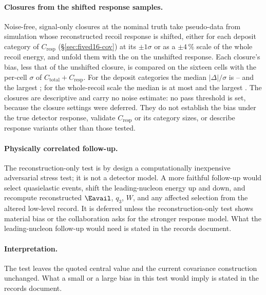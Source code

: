 \paragraph{Closures from the shifted response samples.} Noise-free, signal-only closures at the nominal truth take pseudo-data from simulation whose reconstructed recoil response is shifted, either for each deposit category of $C_{\mathrm{resp}}$ (\S\ref{sec:fived16-cov}) at its $\pm1\sigma$ or as a $\pm4\,\%$ scale of the whole recoil energy, and unfold them with the \estMultiD{} on the unshifted response. Each closure's bias, less that of the unshifted closure, is compared on the sixteen cells with the per-cell $\sigma$ of $C_{\mathrm{total}}+C_{\mathrm{resp}}$. For the deposit categories the median $|\Delta|/\sigma$ is -- and the largest ; for the whole-recoil scale the median is at most  and the largest . The closures are descriptive and carry no noise estimate: no pass threshold is set, because the closure settings were deferred. They do not establish the bias under the true detector response, validate $C_{\mathrm{resp}}$ or its category sizes, or describe response variants other than those tested.

\paragraph{Physically correlated follow-up.} The reconstruction-only test is by design a computationally inexpensive adversarial stress test; it is not a detector model. A more faithful follow-up would select quasielastic events, shift the leading-nucleon energy up and down, and recompute reconstructed $\Eavail$, $q_{3}$, $W$, and any affected selection from the altered low-level record. It is deferred unless the reconstruction-only test shows material bias or the collaboration asks for the stronger response model. What the leading-nucleon follow-up would need is stated in the records document.

\paragraph{Interpretation.} The test leaves the quoted central value and the current covariance construction unchanged. What a small or a large bias in this test would imply is stated in the records document.
